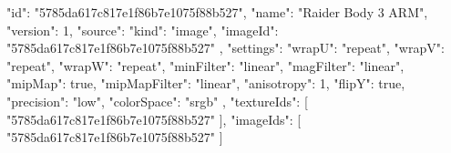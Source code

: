 {
  "id": "5785da617c817e1f86b7e1075f88b527",
  "name": "Raider Body 3 ARM",
  "version": 1,
  "source": {
    "kind": "image",
    "imageId": "5785da617c817e1f86b7e1075f88b527"
  },
  "settings": {
    "wrapU": "repeat",
    "wrapV": "repeat",
    "wrapW": "repeat",
    "minFilter": "linear",
    "magFilter": "linear",
    "mipMap": true,
    "mipMapFilter": "linear",
    "anisotropy": 1,
    "flipY": true,
    "precision": "low",
    "colorSpace": "srgb"
  },
  "textureIds": [
    "5785da617c817e1f86b7e1075f88b527"
  ],
  "imageIds": [
    "5785da617c817e1f86b7e1075f88b527"
  ]
}
